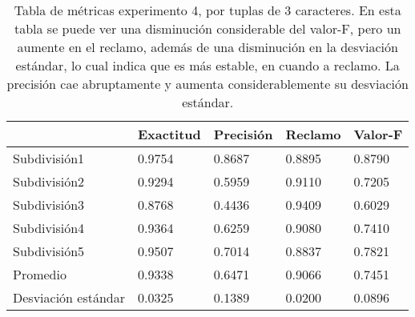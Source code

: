\begin{table}[h]
	\centering
	\caption{Tabla de métricas experimento 4, por tuplas de 3 caracteres. En esta tabla se puede ver una disminución considerable del valor-F, pero un aumente en el reclamo, además de una disminución en la desviación estándar, lo cual indica que es más estable, en cuando a reclamo. La precisión cae abruptamente y aumenta considerablemente su desviación estándar.}
\begin{tabular}{|l|llll|}
\hline
& Exactitud &     Precisión &     Reclamo  &   Valor-F \\ \hline
              
Subdivisión1            &       0.9754  &       0.8687  &       0.8895  &       0.8790  \\ 
Subdivisión2            &       0.9294  &       0.5959  &       0.9110  &       0.7205  \\ 
Subdivisión3            &       0.8768  &       0.4436  &       0.9409  &       0.6029  \\ 
Subdivisión4            &       0.9364  &       0.6259  &       0.9080  &       0.7410  \\ 
Subdivisión5            &       0.9507  &       0.7014  &       0.8837  &       0.7821  \\ \hline
Promedio                &       0.9338  &       0.6471  &       0.9066  &       0.7451  \\ \hline
Desviación estándar     &       0.0325  &       0.1389  &       0.0200  &       0.0896  \\ \hline



\end{tabular}
		     \label{tab:exp4}
\end{table}